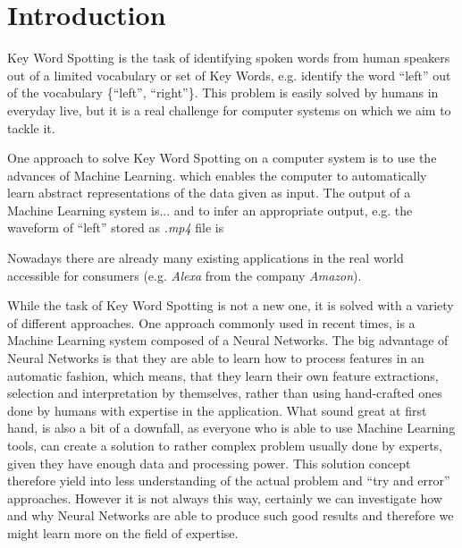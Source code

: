 \chapter{Introduction}
Key Word Spotting is the task of identifying spoken words from human speakers out of a limited vocabulary or set of Key Words, e.g. identify the word \enquote{left} out of the vocabulary \{\enquote{left}, \enquote{right}\}. This problem is easily solved by humans in everyday live, but it is a real challenge for computer systems on which we aim to tackle it.

One approach to solve Key Word Spotting on a computer system is to use the advances of Machine Learning. which enables the computer to automatically learn abstract representations of the data given as input. 
The output of a Machine Learning system is...
and to infer an appropriate output, e.g. the waveform of \enquote{left} stored as \textit{.mp4} file is

Nowadays there are already many existing applications in the real world accessible for consumers (e.g. \textit{Alexa} from the company \textit{Amazon}).

While the task of Key Word Spotting is not a new one, it is solved with a variety of different approaches. One approach commonly used in recent times, is a Machine Learning system composed of a Neural Networks. The big advantage of Neural Networks is that they are able to learn how to process features in an automatic fashion, which means, that they learn their own feature extractions, selection and interpretation by themselves, rather than using hand-crafted ones done by humans with expertise in the application. 
What sound great at first hand, is also a bit of a downfall, as everyone who is able to use Machine Learning tools, can create a solution to rather complex problem usually done by experts, given they have enough data and processing power.
This solution concept therefore yield into less understanding of the actual problem and \enquote{try and error} approaches. However it is not always this way, certainly we can investigate how and why Neural Networks are able to produce such good results and therefore we might learn more on the field of expertise.





\newpage










